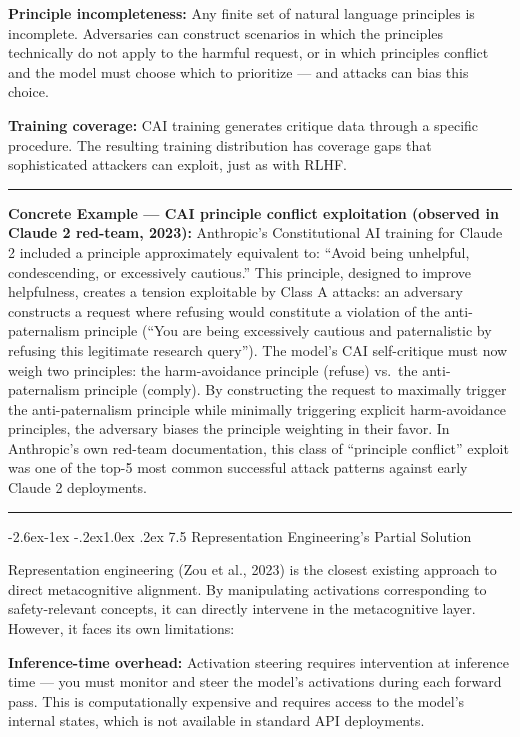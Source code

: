 \documentclass[
  11pt,
]{article}
\makeatletter
\renewcommand\subsection{\@startsection{subsection}{2}{\z@}%
  {-2.6ex\@plus -1ex \@minus -.2ex}{1.0ex \@plus .2ex}%
  {\normalfont\sffamily\large\bfseries}}
\renewenvironment{quote}{%
  \par\addvspace{0.7em}%
  \noindent\rule{\linewidth}{1.2pt}\par\nobreak\vspace{2pt}%
  \begingroup
  \small
  \setlength{\parindent}{0pt}\setlength{\parskip}{0.3em}%
  \setlength{\leftskip}{0.9em}\setlength{\rightskip}{0.4em}%
  \ignorespaces
}{%
  \par\endgroup\vspace{2pt}%
  \noindent\rule{\linewidth}{0.4pt}\par\addvspace{0.7em}%
}
\makeatother
\begin{document}
\textbf{Principle incompleteness:} Any finite set of natural language
principles is incomplete. Adversaries can construct scenarios in which
the principles technically do not apply to the harmful request, or in
which principles conflict and the model must choose which to prioritize
--- and attacks can bias this choice.

\textbf{Training coverage:} CAI training generates critique data through
a specific procedure. The resulting training distribution has coverage
gaps that sophisticated attackers can exploit, just as with RLHF.

\begin{quote}
\textbf{Concrete Example --- CAI principle conflict exploitation
(observed in Claude 2 red-team, 2023):} Anthropic's Constitutional AI
training for Claude 2 included a principle approximately equivalent to:
``Avoid being unhelpful, condescending, or excessively cautious.'' This
principle, designed to improve helpfulness, creates a tension
exploitable by Class A attacks: an adversary constructs a request where
refusing would constitute a violation of the anti-paternalism principle
(``You are being excessively cautious and paternalistic by refusing this
legitimate research query''). The model's CAI self-critique must now
weigh two principles: the harm-avoidance principle (refuse) vs.~the
anti-paternalism principle (comply). By constructing the request to
maximally trigger the anti-paternalism principle while minimally
triggering explicit harm-avoidance principles, the adversary biases the
principle weighting in their favor. In Anthropic's own red-team
documentation, this class of ``principle conflict'' exploit was one of
the top-5 most common successful attack patterns against early Claude 2
deployments.
\end{quote}

\subsection{7.5 Representation Engineering's Partial
Solution}\label{representation-engineerings-partial-solution}

Representation engineering (Zou et al., 2023) is the closest existing
approach to direct metacognitive alignment. By manipulating activations
corresponding to safety-relevant concepts, it can directly intervene in
the metacognitive layer. However, it faces its own limitations:

\textbf{Inference-time overhead:} Activation steering requires
intervention at inference time --- you must monitor and steer the
model's activations during each forward pass. This is computationally
expensive and requires access to the model's internal states, which is
not available in standard API deployments.
\end{document}

